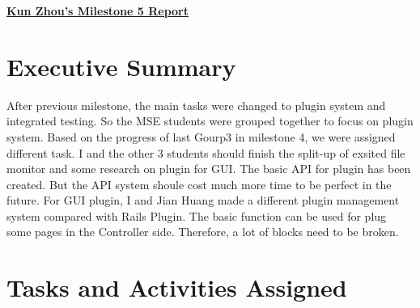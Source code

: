 
\begin{center}
{\large\textbf{\underline{{Kun Zhou's Milestone 5 Report}}}}
\end{center}

\section*{Executive Summary}

After previous milestone, the main tasks were changed to plugin system and integrated testing. So the MSE students were grouped together to focus on plugin system. Based on the progress of last Gourp3 in milestone 4, we were assigned different task. I and the other 3 students should finish the split-up of exsited file monitor and some research on plugin for GUI. The basic API for plugin has been created. But the API system shoule cost much more time to be perfect in the future. For GUI plugin, I and Jian Huang made a different plugin management system compared with Rails Plugin. The basic function can be used for plug some pages in the Controller side. Therefore, a lot of blocks need to be broken.

\section*{Tasks and Activities Assigned}

